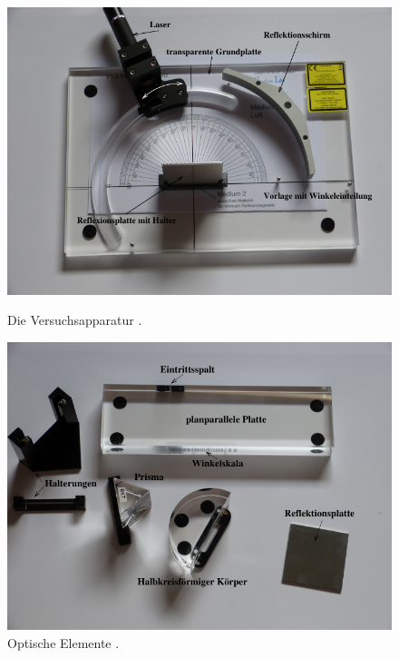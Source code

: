\begin{figure}[H]
  \begin{minipage}[b]{.55\linewidth} %
     \includegraphics[width=\linewidth]{pictures/Aufbau.png}
     \caption{Die Versuchsapparatur \cite{AP01}.}
     \label{fig:Aufbau}
  \end{minipage}
  \begin{minipage}[b]{.55\linewidth} %
     \includegraphics[width=\linewidth]{pictures/Teile.png}
     \caption{Optische Elemente \cite{AP01}.}
     \label{fig:Teile}
  \end{minipage}
\end{figure}

